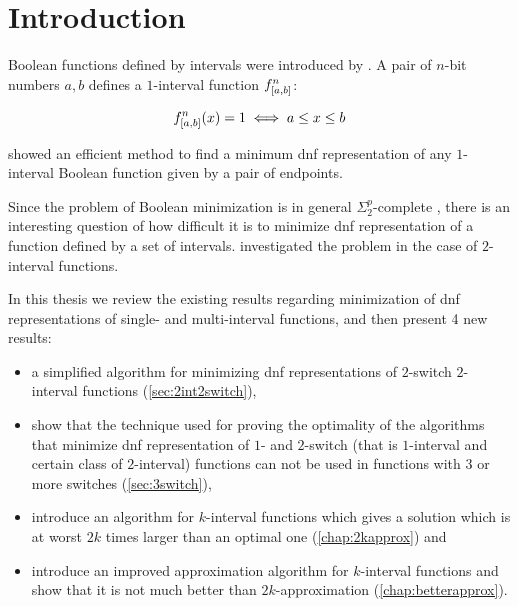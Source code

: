\chapter*{Introduction}


Boolean functions defined by intervals were introduced
by \citet{Schieber2005154}.
A pair of $n$-bit numbers $a, b$
defines a $1$-interval function
$f^{n}_{[a, b]}$:

$$
f^{n}_{[a, b]} (x) = 1
\iff a \leq x \leq b
$$

\citeauthor{Schieber2005154} showed an efficient method
to find a minimum \acrfull{dnf} representation
of any $1$-interval Boolean function
given by a pair of endpoints.

Since the problem of Boolean minimization is in general
$\Sigma_2^p$-complete \citep{Umans1998},
there is an interesting question of how difficult it is
to minimize \acrshort{dnf} representation of
a function defined by a set of intervals.
\citeauthor{Dubovsky2012} investigated the problem
in the case of $2$-interval functions.

In this thesis we review the existing results regarding
minimization of \acrshort{dnf} representations of
single- and multi-interval functions,
and then present 4 new results:

\begin{itemize}
\item a simplified algorithm
for minimizing \acrshort{dnf} representations
of $2$-switch
$2$-interval functions (\autoref{sec:2int2switch}),
\item
show that the technique used for proving the optimality
of the algorithms that minimize
\acrshort{dnf} representation
of $1$- and $2$-switch
(that is $1$-interval and certain class of $2$-interval)
functions
can not be used in
functions with $3$ or more switches
(\autoref{sec:3switch}),
\item
introduce an algorithm
for $k$-interval functions
which gives a solution which is at worst
$2k$ times larger than an optimal one
(\autoref{chap:2kapprox}) and
\item
introduce an improved approximation algorithm
for $k$-interval functions
and show that it is not much better than $2k$-approximation
(\autoref{chap:betterapprox}).
\end{itemize}
